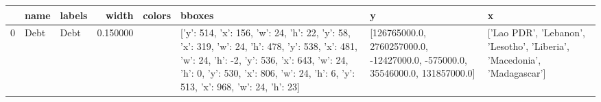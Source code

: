 \begin{tabular}{lllrllll}
\toprule
 & name & labels & width & colors & bboxes & y & x \\
\midrule
0 & Debt & Debt & 0.150000 & #663399 & [{'y': 514, 'x': 156, 'w': 24, 'h': 22}, {'y': 58, 'x': 319, 'w': 24, 'h': 478}, {'y': 538, 'x': 481, 'w': 24, 'h': -2}, {'y': 536, 'x': 643, 'w': 24, 'h': 0}, {'y': 530, 'x': 806, 'w': 24, 'h': 6}, {'y': 513, 'x': 968, 'w': 24, 'h': 23}] & [126765000.0, 2760257000.0, -12427000.0, -575000.0, 35546000.0, 131857000.0] & ['Lao PDR', 'Lebanon', 'Lesotho', 'Liberia', 'Macedonia', 'Madagascar'] \\
\bottomrule
\end{tabular}
